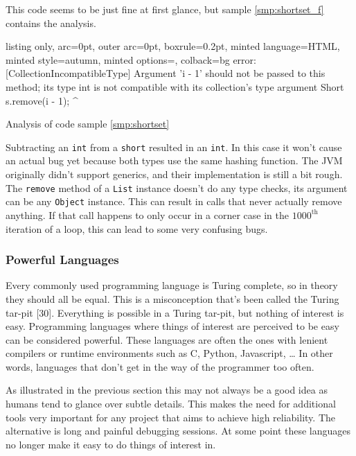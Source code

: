 \documentclass[]{article}
\begin{document}
This code seems to be just fine at first glance, but sample
\ref{smp:shortset_f} contains the analysis.

\begin{code}
  \begin{tcblisting}{listing only, 
  arc=0pt,
  outer arc=0pt, 
  boxrule=0.2pt,
  minted language=HTML,
  minted style=autumn,
  minted options={},
  colback=bg }
error: [CollectionIncompatibleType] Argument 'i - 1' should not be 
passed to this method; its type int is not compatible with its 
collection's type argument Short
      s.remove(i - 1);
              ^
\end{tcblisting}
\caption{Analysis of code sample \ref{smp:shortset}} \label{smp:shortset_f}
\end{code}

Subtracting an \texttt{int} from a \texttt{short} resulted in an
\texttt{int}. In this case it won't cause an actual bug yet because both
types use the same hashing function. The JVM originally didn't support
generics, and their implementation is still a bit rough. The
\texttt{remove} method of a \texttt{List} instance doesn't do any type
checks, its argument can be any \texttt{Object} instance. This can
result in calls that never actually remove anything. If that call
happens to only occur in a corner case in the \(1000^{\text{th}}\)
iteration of a loop, this can lead to some very confusing bugs.

\subsubsection{Powerful Languages}\label{powerful-languages}

Every commonly used programming language is Turing complete, so in
theory they should all be equal. This is a misconception that's been
called the Turing tar-pit {[}30{]}. Everything is possible in a Turing
tar-pit, but nothing of interest is easy. Programming languages where
things of interest are perceived to be easy can be considered powerful.
These languages are often the ones with lenient compilers or runtime
environments such as C, Python, Javascript, \ldots{} In other words,
languages that don't get in the way of the programmer too often.

As illustrated in the previous section this may not always be a good
idea as humans tend to glance over subtle details. This makes the need
for additional tools very important for any project that aims to achieve
high reliability. The alternative is long and painful debugging
sessions. At some point these languages no longer make it easy to do
things of interest in.
\end{document}
